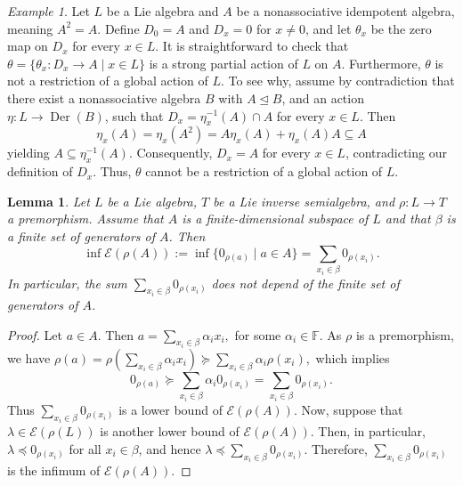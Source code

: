 \documentclass[10pt,a4paper]{amsart}
\newtheorem{lem}[thm]{Lemma}
\theoremstyle{definition}
\theoremstyle{remark}
\newtheorem{ex}[thm]{Example}
\numberwithin{equation}{section}
\newtheorem*{Theorem A}{\textbf{Theorem A}}
\newtheorem*{Corollary E}{\textbf{Corollary E}}
\newtheorem*{Corollary F}{\textbf{Corollary F}}
\newtheorem*{Theorem B}{\textbf{Theorem B}}
\newtheorem*{Theorem C}{\textbf{Theorem C}}
\newtheorem*{Theorem D}{\textbf{Theorem B}}
\newtheorem*{p a}{\textbf{Proof of  Theorem A}}
\newtheorem*{p b}{\textbf{Proof of Theorem B}}
\newtheorem*{p c}{\textbf{Proof of  Theorem C}}
\newtheorem*{p d}{\textbf{Proof of  Theorem D}}
\newcommand{\E}{\mathcal{E}}
\newcommand{\F}{\mathbb{F}}
\newcommand{\0}{{\vartheta}}
\DeclareMathOperator{\der}{Der}
\DeclareMathOperator{\pen}{\textsf{PEnd}}
\DeclareMathOperator{\pde}{\textsf{PDer}}
\begin{document}
\begin{ex}
Let $L$ be a Lie algebra and $A$ be a nonassociative idempotent algebra, meaning $A^2=A$. Define $D_0=A$ and $D_x=0$ for $x\neq 0$, and  let $\theta_x$ be the zero map on $D_x$ for every $x\in L$. It is straightforward to check that  $\theta=\{\theta_x: D_{x} \rightarrow A\mid x\in L \}$ is a strong partial action of $L$ on $A$. Furthermore, $\theta$ is not a restriction of a global action of $L$. To see why, assume by contradiction that there exist a nonassociative algebra $B$ with $A\unlhd B$, and an action  $\eta: L\to \der(B)$, such that $D_x=\eta_x^{-1}(A)\cap A$ for every $x\in L$. Then $$\eta_x(A)=\eta_x(A^2)=A\eta_x(A)+\eta_x(A)A\subseteq A$$
yielding $A\subseteq \eta_x^{-1}(A)$. Consequently, $D_x=A$ for every $x\in L$, contradicting our  definition of $D_x$. Thus, $\theta$ cannot be a restriction of a global action of 
$L.$
\end{ex}






\begin{lem}\label{welldefined}
Let $L$ be a Lie algebra, $T$ be  a Lie inverse semialgebra, and $\rho: L\to T$ a premorphism. Assume that $A$ is a finite-dimensional subspace of $L$ and that $\beta$ is a finite set of generators of $A$. Then   
$$\inf \E(\rho(A)):=\inf\{0_{\rho(a)}\mid a\in A\}=\sum_{x_i\in \beta} 0_{\rho(x_i)}.$$ 
In particular, the sum $\sum_{x_i\in \beta} 0_{\rho(x_i)}$ does not depend of the finite set of generators of $A$. 
\end{lem}
\begin{proof}
Let $a\in A$. Then $a=\sum_{x_i\in \beta}\alpha_ix_{i},$ for some $\alpha_i\in \F$. As $\rho$ is a premorphism, we have $\rho(a)=\rho (\sum_{x_i\in \beta}\alpha_ix_{i}) 
\succeq \sum_{x_i\in \beta}\alpha_i\rho(x_{i}),$ which implies
$$0_{\rho(a)}\succeq\sum_{x_i\in \beta}\alpha_i0_{\rho(x_i)}=\sum_{x_i\in \beta}0_{\rho(x_i)}.$$
Thus $\sum_{x_i\in \beta}0_{\rho(x_i)}$ is a lower bound of $\E(\rho(A))$. Now, suppose that $\lambda\in \E(\rho(L))$ is another lower bound of $\E(\rho(A)).$ Then, in particular, $\lambda\preceq 0_{\rho(x_i)}$ for all $x_i\in \beta$, and hence $\lambda\preceq \sum_{x_i\in \beta}0_{\rho(x_i)}.$ Therefore, $\sum_{x_i\in \beta}0_{\rho(x_i)}$ is the infimum of $\E(\rho(A))$.
\end{proof}
\end{document}
